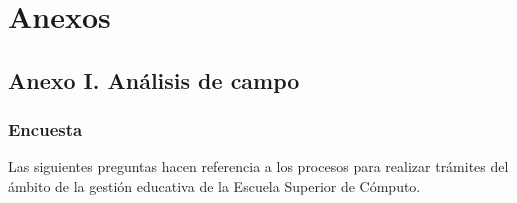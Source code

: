 \chapter{Anexos}
        
    \section{Anexo I. Análisis de campo}
    
        \subsection{Encuesta}
            Las siguientes preguntas hacen referencia a los procesos para realizar trámites del ámbito de la gestión educativa de la Escuela Superior de Cómputo.
    
